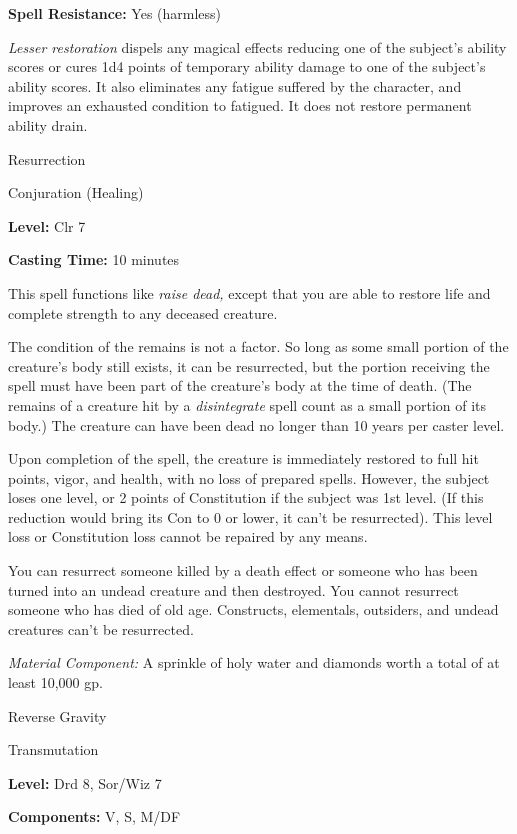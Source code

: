 \documentclass{article}
\begin{document}
\textbf{Spell Resistance:} Yes (harmless)

\textit{Lesser restoration }dispels any magical effects reducing one of the subject's 
ability scores or cures 1d4 points of temporary ability damage to one of the subject's 
ability scores. It also eliminates any fatigue suffered by the character, and improves 
an exhausted condition to fatigued. It does not restore permanent ability drain.

\vspace{12pt}
Resurrection

Conjuration (Healing)

\textbf{Level:} Clr 7

\textbf{Casting Time:} 10 minutes

This spell functions like \textit{raise dead, }except that you are able to restore 
life and complete strength to any deceased creature.

The condition of the remains is not a factor. So long as some small portion of 
the creature's body still exists, it can be resurrected, but the portion receiving 
the spell must have been part of the creature's body at the time of death. (The 
remains of a creature hit by a \textit{disintegrate }spell count as a small portion 
of its body.) The creature can have been dead no longer than 10 years per caster 
level.

Upon completion of the spell, the creature is immediately restored to full hit 
points, vigor, and health, with no loss of prepared spells. However, the subject 
loses one level, or 2 points of Constitution if the subject was 1st level. (If 
this reduction would bring its Con to 0 or lower, it can't be resurrected). This 
level loss or Constitution loss cannot be repaired by any means.

You can resurrect someone killed by a death effect or someone who has been turned 
into an undead creature and then destroyed. You cannot resurrect someone who has 
died of old age. Constructs, elementals, outsiders, and undead creatures can't 
be resurrected.

\textit{Material Component: }A sprinkle of holy water and diamonds worth a total 
of at least 10,000 gp.

\vspace{12pt}
Reverse Gravity

Transmutation

\textbf{Level:} Drd 8, Sor/Wiz 7

\textbf{Components:} V, S, M/DF
\end{document}

